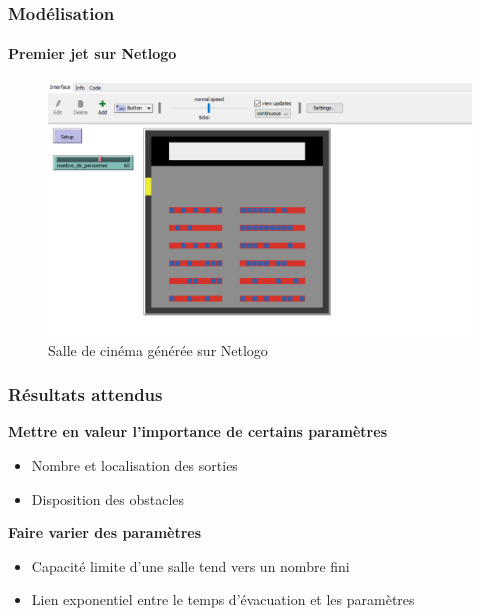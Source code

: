 \documentclass{beamer}
\begin{document}
\begin{frame}
	\frametitle{Modélisation}
	\framesubtitle{Premier jet sur Netlogo}
	
	
	\begin{figure}
	\bigskip
  		\includegraphics[width=\linewidth]{Cine_Setup.PNG}
 		\caption{Salle de cinéma générée sur Netlogo}
 		\label{pic: cine}
\end{figure}
	
\end{frame}




\begin{frame}
	\frametitle{Résultats attendus}
	
	\begin{block}{\textbf{Mettre en valeur l'importance de certains paramètres}}
	\begin{itemize}
	\item Nombre et localisation des sorties
	\item Disposition des obstacles
	\end{itemize}
	\end{block}
	
	\bigskip
	
	\begin{block}{\textbf{Faire varier des paramètres}}
	\begin{itemize}
	\item Capacité limite d'une salle tend vers un nombre fini
	\item Lien exponentiel entre le temps d'évacuation et les 				paramètres
	\end{itemize}
	\end{block}
\end{frame}


\end{document}
